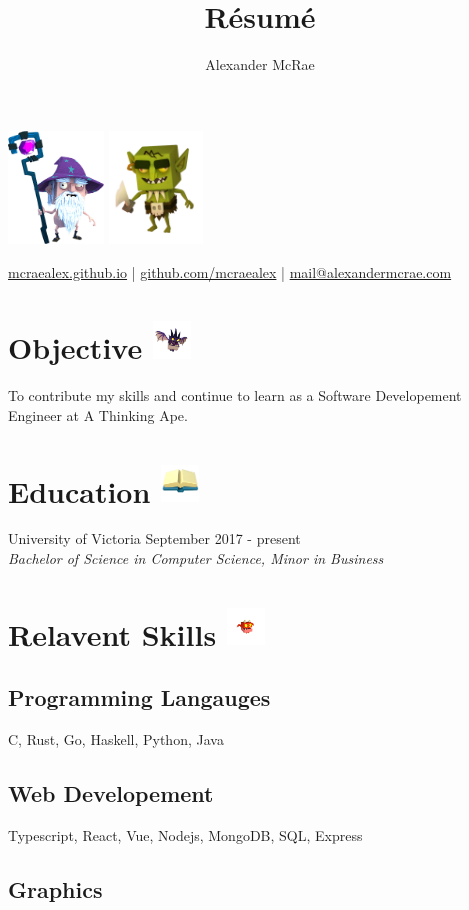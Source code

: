 \documentclass{article}
\makeatletter
\renewcommand{\maketitle}{
\begin{center}
\includegraphics[height=3cm]{cedric-desktop.png}
{\huge \bfseries \theauthor}
\includegraphics[height=3cm]{goblin.png}

\vspace{0.25em}
\url{mcraealex.github.io} | \url{github.com/mcraealex} | \href{mailto:mail@alexandermcrae.com}{mail@alexandermcrae.com}
\end{center}}
\makeatother
\begin{document}
\title{R\'esum\'e}
\author{Alexander McRae}

\maketitle

\section{Objective \protect\includegraphics[height=1cm]{Quartz.png}}

To contribute my skills and continue to learn as a Software Developement Engineer at A Thinking Ape.

\section{Education \protect\includegraphics[height=1cm]{Education.png}}

University of Victoria \hfill September 2017 - present\\
\textit{Bachelor of Science in Computer Science, Minor in Business}

\section{Relavent Skills \protect\includegraphics[height=1cm]{Ruby.png}}

\subsection{Programming Langauges}

C, Rust, Go, Haskell, Python, Java

\subsection{Web Developement}

Typescript, React, Vue, Nodejs, MongoDB, SQL, Express

\subsection{Graphics}
\end{document}
